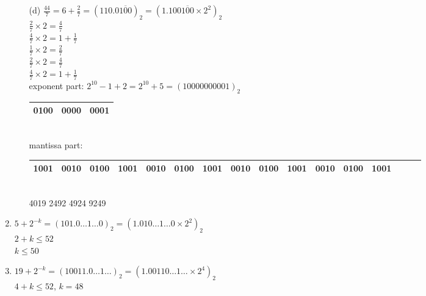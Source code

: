 \documentclass[UTF8]{ctexart}
\begin{document}
\begin{enumerate}
\begin{itemize}
\item[(d)] $\frac{44}{7} = 6 + \frac{2}{7} = (110.0\overline{100})_2 = (1.100\overline{100} \times 2^2)_2$ \\
$\frac{2}{7} \times 2 = \frac{4}{7}$ \\
$\frac{4}{7} \times 2 = 1 + \frac{1}{7}$ \\
$\frac{1}{7} \times 2 = \frac{2}{7}$ \\
$\frac{2}{7} \times 2 = \frac{4}{7}$ \\
$\frac{4}{7} \times 2 = 1 + \frac{1}{7}$ \\
exponent part: $2^{10} - 1 + 2 = 2^{10} + 5 = (100 0000 0001)_2$ \\
\begin{tabular}{|c|c|c|}
\hline
0100 & 0000 & 0001\\
\hline
\end{tabular} \\
mantissa part: \\
\begin{tabular}{|c|c|c|c|c|c|c|c|c|c|c|c|c|c|c|c|}
\hline
1001&0010&0100&1001&0010&0100&1001&0010&0100&1001&0010&0100&1001\\
\hline
\end{tabular} \\
4019 2492 4924 9249

\end{itemize}

\item $5 + 2^{-k} = (101.0 \dots 1 \dots 0)_2 = (1.010 \dots 1 \dots 0 \times 2^2)_2$ \\
$2 + k \le 52$ \\
$k \le 50$

\item $19 + 2^{-k} = (10011.0 \dots 1 \dots)_2 = (1.00110 \dots 1 \dots \times 2^4)_2$ \\
$4 + k \le 52$, $k = 48$


\end{enumerate}
\end{document}
